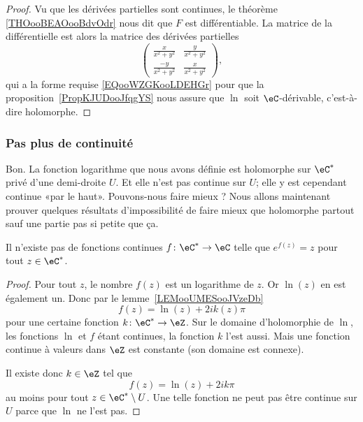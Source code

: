 \begin{proof}
    Vu que les dérivées partielles sont continues, le théorème \ref{THOooBEAOooBdvOdr} nous dit que \( F\) est différentiable. La matrice de la différentielle est alors la matrice des dérivées partielles
    \begin{equation}
        \begin{pmatrix}
            \frac{ x }{ x^2+y^2 }    &   \frac{ y }{ x^2+y^2 }    \\
            \frac{ -y }{ x^2+y^2 }    &   \frac{ x }{ x^2+y^2 }
        \end{pmatrix},
    \end{equation}
    qui a la forme requise \eqref{EQooWZGKooLDEHGr} pour que la proposition~\ref{PropKJUDooJfqgYS} nous assure que \( \ln\) soit \( \eC\)-dérivable, c'est-à-dire holomorphe.
\end{proof}

\subsubsection{Pas plus de continuité}

Bon. La fonction logarithme que nous avons définie est holomorphe sur \( \eC^*\) privé d'une demi-droite \( U\). Et elle n'est pas continue sur \( U\); elle y est cependant continue «par le haut». Pouvons-nous faire mieux ? Nous allons maintenant prouver quelques résultats d'impossibilité de faire mieux que holomorphe partout sauf une partie pas si petite que ça.

\begin{proposition}
    Il n'existe pas de fonctions continues \( f\colon \eC^*\to \eC\) telle que \(  e^{f(z)}=z\) pour tout \( z\in \eC^*\).
\end{proposition}

\begin{proof}
    Pour tout \( z\), le nombre \( f(z)\) est un logarithme de \( z\). Or \( \ln(z)\) en est également un. Donc par le lemme~\ref{LEMooUMESooJVzeDb}
    \begin{equation}
        f(z)=\ln(z)+2i k(z)\pi
    \end{equation}
    pour une certaine fonction \( k\colon \eC^*\to \eZ\). Sur le domaine d'holomorphie de \( \ln\), les fonctions \( \ln\) et \( f\) étant continues, la fonction \( k\) l'est aussi. Mais une fonction continue à valeurs dans \( \eZ\) est constante (son domaine est connexe).

    Il existe donc \( k\in \eZ\) tel que
    \begin{equation}
         f(z)=\ln(z)+2ik\pi
    \end{equation}
    au moins pour tout \( z\in \eC^*\setminus U\). Une telle fonction ne peut pas être continue sur \( U\) parce que \( \ln\) ne l'est pas.
\end{proof}

